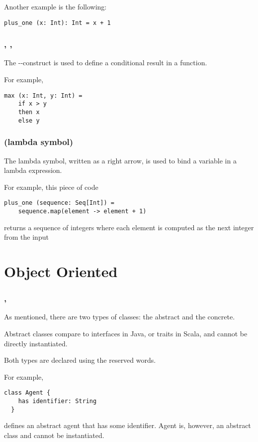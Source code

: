 Another example is the following:
\begin{lstlisting}[label={lst:exampleType02}]
  plus_one (x: Int): Int = x + 1
\end{lstlisting}

\subsubsection{\sif, \sthen, \selse}

The \sif-\sthen-\selse construct is used to define a conditional result in a function.

For example,
\begin{lstlisting}[label={lst:exampleIfThenElse}]
  max (x: Int, y: Int) =
    if x > y
    then x
    else y
\end{lstlisting}

\subsubsection{\slambda (lambda symbol)}

The lambda symbol, written as a right arrow, is used to bind a variable in a lambda expression.

For example, this piece of code
\begin{lstlisting}[label={lst:exampleLambda}]
  plus_one (sequence: Seq[Int]) =
    sequence.map(element -> element + 1)
\end{lstlisting}
returns a sequence of integers where each element is computed as the next integer from the input


\section{Object Oriented}

\subsubsection{\sclass, \shas}

As mentioned, there are two types of classes: the abstract and the concrete.

Abstract classes compare to interfaces in Java, or traits in Scala, and cannot be directly instantiated.

Both types are declared using the \sclass reserved words.

For example,
\begin{lstlisting}[label={lst:exampleAbstractClass}]
  class Agent {
    has identifier: String
  }
\end{lstlisting}
defines an abstract agent that has some identifier.
Agent is, however, an abstract class and cannot be instantiated.


